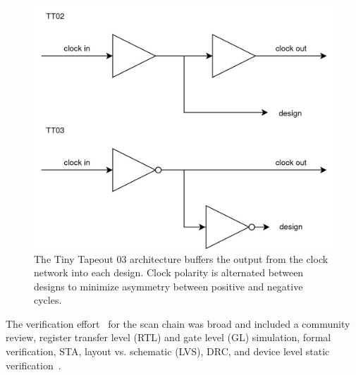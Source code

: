 \begin{figure}[!t]
\centering
\includegraphics[width=\columnwidth]{./Figs/tt02 vs tt03 scanchain clock.png}
\caption{The Tiny Tapeout 03 architecture buffers the output from the clock network into each design. Clock polarity is alternated between designs to minimize asymmetry between positive and negative cycles.}
\label{fig:TT02_vs_TT03}
\end{figure}

The verification effort~\cite{verificationmd} for the scan chain was broad and included a community review, register transfer level (RTL) and gate level (GL) simulation, formal verification\cite{sby}, STA, layout vs. schematic (LVS), DRC, and device level static verification~\cite{cvc}.
